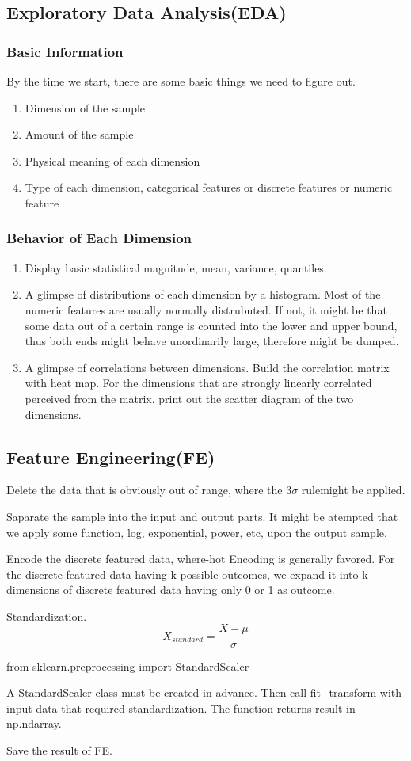 \documentclass{article}
\begin{document}
\subsection{Exploratory Data Analysis(EDA)}
\subsubsection{Basic Information}
By the time we start, there are some basic things we need to figure out.
\begin{enumerate}
	\item Dimension of the sample
	\item Amount of the sample
	\item Physical meaning of each dimension
	\item Type of each dimension, categorical features or discrete features or numeric feature
\end{enumerate}
\subsubsection{Behavior of Each Dimension}
\begin{enumerate}
	\item Display basic statistical magnitude, mean, variance, quantiles.
	\item A glimpse of distributions of each dimension by a histogram. Most of the numeric features are usually normally distrubuted. If not, it might be that some data out of a certain range is counted into the lower and upper bound, thus both ends might behave unordinarily large, therefore might be dumped.
	\item A glimpse of correlations between dimensions. Build the correlation matrix with heat map. For the dimensions that are strongly linearly correlated perceived from the matrix, print out the scatter diagram of the two dimensions.
\end{enumerate}
\subsection{Feature Engineering(FE)}
	Delete the data that is obviously out of range, where the $3\sigma$ rulemight be applied.

	Saparate the sample into the input and output parts. It might be atempted that we apply some function, log, exponential, power, etc, upon the output sample.

	Encode the discrete featured data, where-hot Encoding is generally favored. For the discrete featured data having k possible outcomes, we expand it into k dimensions of discrete featured data having only 0 or 1 as outcome.

	Standardization.
	\begin{displaymath}
		X_{standard} = \frac{X - \mu}{\sigma}
	\end{displaymath}
	
	from sklearn.preprocessing import StandardScaler

	A StandardScaler class must be created in advance. Then call fit_transform with input data that required standardization. The function returns result in np.ndarray.

	Save the result of FE.
\end{document}
